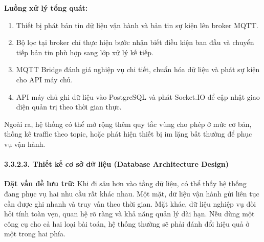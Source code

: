 \documentclass[a4paper]{extarticle}
\providecommand{\tightlist}{%
  \setlength{\itemsep}{0pt}\setlength{\parskip}{0pt}}
\begin{document}
\textbf{Luồng xử lý tổng quát:}

\begin{enumerate}
\tightlist
\item
  Thiết bị phát bản tin dữ liệu vận hành và bản tin sự kiện lên broker
  MQTT.
\item
  Bộ lọc tại broker chỉ thực hiện bước nhận biết điều kiện ban đầu và
  chuyển tiếp bản tin phù hợp sang lớp xử lý kế tiếp.
\item
  MQTT Bridge đánh giá nghiệp vụ chi tiết, chuẩn hóa dữ liệu và phát sự
  kiện cho API máy chủ.
\item
  API máy chủ ghi dữ liệu vào PostgreSQL và phát Socket.IO để cập
  nhật giao diện quản trị theo thời gian thực.
\end{enumerate}

Ngoài ra, hệ thống có thể mở rộng thêm quy tắc vùng cho phép ở mức cơ bản, thống
kê traffic theo topic, hoặc phát hiện thiết bị im lặng bất thường để
phục vụ vận hành.

\paragraph{3.3.2.3. Thiết kế cơ sở dữ liệu (Database Architecture
Design)}\label{3233-thiux1ebft-kux1ebf-cux1a1-sux1edf-dux1eef-liux1ec7u-database-architecture-design}

\textbf{Đặt vấn đề lưu trữ:} Khi đi sâu hơn vào tầng dữ liệu, có thể thấy
hệ thống đang phục vụ hai nhu cầu rất khác nhau. Một mặt, dữ liệu vận
hành gửi liên tục cần
được ghi nhanh và truy vấn theo thời gian. Mặt khác, dữ liệu nghiệp vụ
đòi hỏi tính toàn vẹn, quan hệ rõ ràng và khả năng quản lý dài hạn. Nếu
dùng một công cụ cho cả hai loại bài toán, hệ thống thường sẽ phải đánh
đổi hiệu quả ở một trong hai phía.
\end{document}
